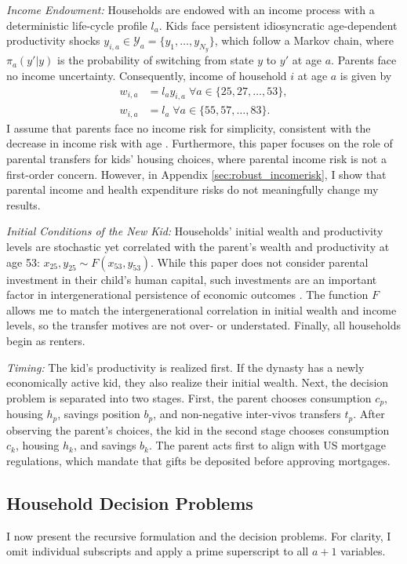 \documentclass[12pt]{article}
\begin{document}
\textit{Income Endowment:} Households are endowed with an income process with a deterministic life-cycle profile $l_a$. Kids face persistent idiosyncratic age-dependent productivity shocks $y_{i,a}\in\mathcal{Y}_a=\{y_1,\dots,y_{N_y}\}$, which follow a Markov chain, where $\pi_a(y'|y)$ is the probability of switching from state $y$ to $y'$ at age $a$. Parents face no income uncertainty. Consequently, income of household $i$ at age $a$ is given by
\begin{align}
w_{i,a} &= l_ay_{i,a} \; \forall a\in\{25,27,\dots,53\}, \label{eq:wk} \\
w_{i,a} &= l_a \; \forall a\in\{55,57,\dots,83\}. \label{eq:wp}
\end{align}
I assume that parents face no income risk for simplicity, consistent with the decrease in income risk with age \citep{Sanchez2020}. Furthermore, this paper focuses on the role of parental transfers for kids' housing choices, where parental income risk is not a first-order concern. However, in Appendix \ref{sec:robust_incomerisk}, I show that parental income and health expenditure risks do not meaningfully change my results.

\textit{Initial Conditions of the New Kid:} Households' initial wealth and productivity levels are stochastic yet correlated with the parent's wealth and productivity at age 53: $x_{25},y_{25} \sim F(x_{53},y_{53})$. While this paper does not consider parental investment in their child's human capital, such investments are an important factor in intergenerational persistence of economic outcomes \citep{Daruich2018,Lee2019}. The function $F$ allows me to match the intergenerational correlation in initial wealth and income levels, so the transfer motives are not over- or understated. Finally, all households begin as renters.

\textit{Timing:} The kid's productivity is realized first. If the dynasty has a newly economically active kid, they also  realize their initial wealth. Next, the decision problem is separated into two stages. First, the parent chooses  consumption $c_p$, housing $h_p$, savings position $b_p$, and non-negative inter-vivos transfers $t_p$. After observing the parent's choices, the kid in the second stage chooses consumption $c_k$, housing $h_k$, and savings $b_k$. The parent acts first to align with US mortgage regulations, which mandate that gifts be deposited before approving mortgages.

\subsection{Household Decision Problems}
I now present the recursive formulation and the decision problems. For clarity, I omit individual subscripts and apply a prime superscript to all  $a+1$ variables.
\end{document}

